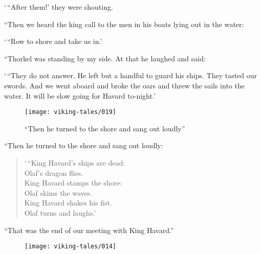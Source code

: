 `\,``After them!' they were shouting.

``Then we heard the king call to the men in his boats lying out in the
water:

`\,``Row to shore and take us in.'

``Thorkel was standing by my side. At that he laughed and said:

`\,``They do not answer. He left but a handful to guard his ships. They
tasted our swords. And we went aboard and broke the oars and threw the
sails into the water. It will be slow going for Havard to-night.'

\begin{figure}[ht]
    \centering
    \texttt{[image: viking-tales/019]}
    \caption{``Then he turned to the shore and sang out loudly''}
\end{figure}

``Then he turned to the shore and sang out loudly:

\begin{quote}
`\,``King Havard's ships are dead:\\
Olaf's dragon flies.\\
King Havard stamps the shore:\\
Olaf skims the waves.\\
King Havard shakes his fist.\\
Olaf turns and laughs.'
\end{quote}

``That was the end of our meeting with King Havard.''

\begin{figure}[hb]
    \centering
    \vskip8pt
    \texttt{[image: viking-tales/014]}
\end{figure}
